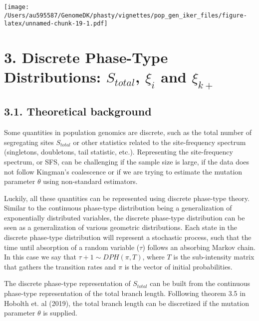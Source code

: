 \documentclass[]{article}
\begin{document}
\texttt{[image: /Users/au595587/GenomeDK/phasty/vignettes/pop\_gen\_iker\_files/figure-latex/unnamed-chunk-19-1.pdf]}

\hypertarget{discrete-phase-type-distributions-s_total-xi_i-and-xi_k}{%
\section{\texorpdfstring{3. Discrete Phase-Type Distributions:
\(S_{total}\), \(\xi_i\) and
\(\xi_{k+}\)}{3. Discrete Phase-Type Distributions: S\_\{total\}, \textbackslash{}xi\_i and \textbackslash{}xi\_\{k+\}}}\label{discrete-phase-type-distributions-s_total-xi_i-and-xi_k}}

\hypertarget{theoretical-background-1}{%
\subsection{3.1. Theoretical
background}\label{theoretical-background-1}}

Some quantities in population genomics are discrete, such as the total
number of segregating sites \(S_{total}\) or other statistics related to
the site-frequency spectrum (singletons, doubletons, tail statistic,
etc.). Representing the site-frequency spectrum, or SFS, can be
challenging if the sample size is large, if the data does not follow
Kingman's coalescence or if we are trying to estimate the mutation
parameter \(\theta\) using non-standard estimators.

Luckily, all these quantities can be represented using discrete
phase-type theory. Similar to the continuous phase-type distribution
being a generalization of exponentially distributed variables, the
discrete phase-type distribution can be seen as a generalization of
various geometric distributions. Each state in the discrete phase-type
distribution will represent a stochastic process, such that the time
until absorption of a random variable (\(\tau\)) follows an absorbing
Markov chain. In this case we say that \(\tau+1\sim DPH(\pi, T)\), where
\(T\) is the sub-intensity matrix that gathers the transition rates and
\(\pi\) is the vector of initial probabilities.

The discrete phase-type representation of \(S_{total}\) can be built
from the continuous phase-type representation of the total branch
length. Folllowing theorem 3.5 in Hobolth et. al (2019), the total
branch length can be discretized if the mutation parameter \(\theta\) is
supplied.
\end{document}
